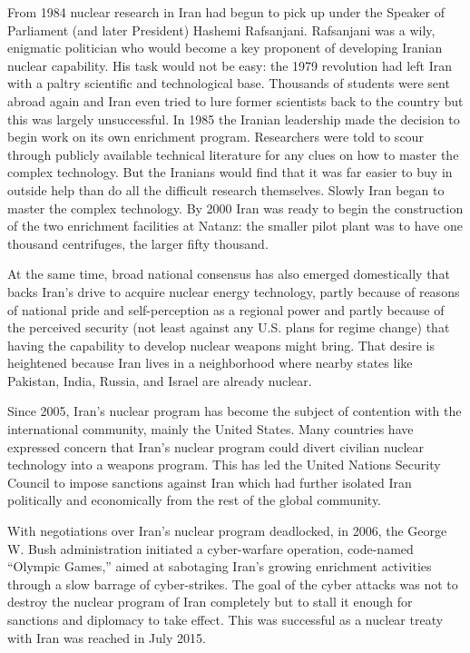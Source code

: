 \documentclass[12pt]{article}
\begin{document}
From 1984 nuclear research in Iran had begun to pick up under the Speaker of Parliament (and later President) Hashemi Rafsanjani. Rafsanjani was a wily, enigmatic politician who would become a key proponent of developing Iranian nuclear capability. His task would not be easy: the 1979 revolution had left Iran with a paltry scientific and technological base. Thousands of students were sent abroad again and Iran even tried to lure former scientists back to the country but this was largely unsuccessful.
In 1985 the Iranian leadership made the decision to begin work on its own enrichment program. Researchers were told to scour through publicly available technical literature for any clues on how to master the complex technology. But the Iranians would find that it was far easier to buy in outside help than do all the difficult research themselves. Slowly Iran began to master the complex technology. By 2000 Iran was ready to begin the construction of the two enrichment facilities at Natanz: the smaller pilot plant was to have one thousand centrifuges, the larger fifty thousand.

At the same time,  broad national consensus has also emerged domestically that backs Iran’s drive to acquire nuclear energy technology, partly because of reasons of national pride and self-perception as a regional power and partly because of the perceived security (not least against any U.S. plans for regime change) that having the capability to develop nuclear weapons might bring. That desire is heightened because Iran lives in a neighborhood where nearby states like Pakistan, India, Russia, and Israel are already nuclear. \cite{corera2009shopping}

Since 2005, Iran's nuclear program has become the subject of contention with the international community, mainly the United States. Many countries have expressed concern that Iran's nuclear program could divert civilian nuclear technology into a weapons program. This has led the United Nations Security Council to impose sanctions against Iran which had further isolated Iran politically and economically from the rest of the global community. 

With negotiations over Iran’s nuclear program deadlocked, in 2006, the George W. Bush administration initiated a cyber-warfare operation, code-named “Olympic Games,” aimed at sabotaging Iran’s growing enrichment activities through a slow barrage of cyber-strikes.
The goal of the cyber attacks was not to destroy the nuclear program of Iran completely but to stall it enough for sanctions and diplomacy to take effect. This was successful as a nuclear treaty with Iran was reached in July 2015.\cite{sangercyber}
\end{document}
